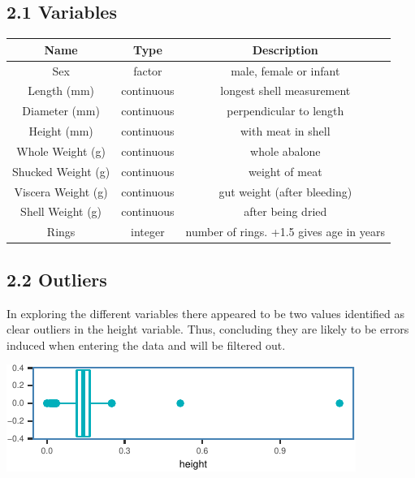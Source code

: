 \documentclass[letterpaper,9pt,twocolumn,twoside,]{pinp}
\begin{document}
\hypertarget{variables}{%
\subsection{2.1 Variables}\label{variables}}

\begin{center}
\begin{tabular}{|c|c|c|}
\hline
\textbf{Name} & \textbf{Type} & \textbf{Description} \\
\hline

Sex & factor & male, female or infant \\
\hline
Length (mm) & continuous & longest shell measurement \\
\hline
Diameter (mm) & continuous & perpendicular to length \\
\hline
Height (mm) & continuous & with meat in shell \\
\hline
Whole Weight (g) & continuous & whole abalone \\
\hline
Shucked Weight (g) & continuous & weight of meat \\
\hline
Viscera Weight (g) & continuous & gut weight (after bleeding) \\
\hline
Shell Weight (g) & continuous & after being dried \\
\hline
Rings & integer & number of rings. +1.5 gives age in years \\
\hline
\end{tabular}
\end{center}

\newpage

\hypertarget{outliers}{%
\subsection{2.2 Outliers}\label{outliers}}

In exploring the different variables there appeared to be two values
identified as clear outliers in the height variable. Thus, concluding
they are likely to be errors induced when entering the data and will be
filtered out.

\begin{center}\includegraphics{ExecSum_files/figure-latex/unnamed-chunk-1-1} \end{center}
\end{document}
